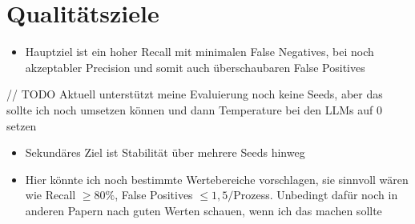 \section{Qualitätsziele}\label{sec:qualitatsziele}

\begin{itemize}
    \item Hauptziel ist ein hoher Recall mit minimalen False Negatives, bei noch akzeptabler Precision und somit auch überschaubaren False Positives
\end{itemize}

// TODO Aktuell unterstützt meine Evaluierung noch keine Seeds, aber das sollte ich noch umsetzen können und dann Temperature bei den LLMs auf 0 setzen

\begin{itemize}
    \item Sekundäres Ziel ist Stabilität über mehrere Seeds hinweg
    \item Hier könnte ich noch bestimmte Wertebereiche vorschlagen, sie sinnvoll wären wie Recall $\geq 80\%$, False Positives $\leq 1{,}5/$Prozess. Unbedingt dafür noch in anderen Papern nach guten Werten schauen, wenn ich das machen sollte
\end{itemize}